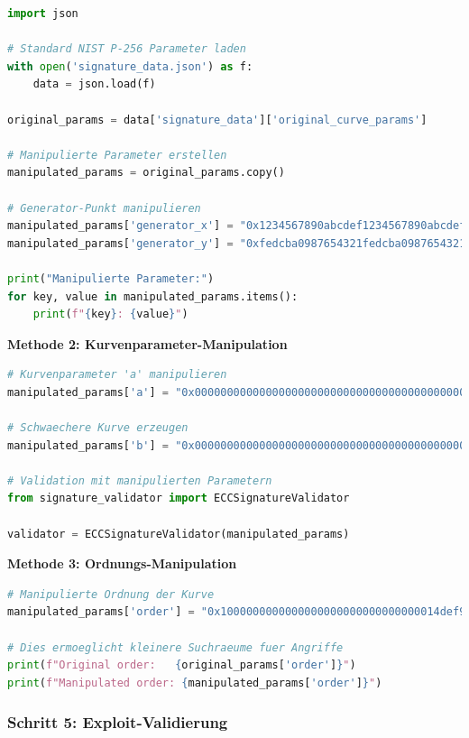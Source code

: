 \documentclass{article}
\begin{document}
\begin{lstlisting}[language=python, caption=Generator-Manipulation]
import json

# Standard NIST P-256 Parameter laden
with open('signature_data.json') as f:
    data = json.load(f)

original_params = data['signature_data']['original_curve_params']

# Manipulierte Parameter erstellen
manipulated_params = original_params.copy()

# Generator-Punkt manipulieren
manipulated_params['generator_x'] = "0x1234567890abcdef1234567890abcdef1234567890abcdef1234567890abcdef"
manipulated_params['generator_y'] = "0xfedcba0987654321fedcba0987654321fedcba0987654321fedcba0987654321"

print("Manipulierte Parameter:")
for key, value in manipulated_params.items():
    print(f"{key}: {value}")
\end{lstlisting}

\textbf{Methode 2: Kurvenparameter-Manipulation}

\begin{lstlisting}[language=python, caption=Kurvenkoeffizienten ändern]
# Kurvenparameter 'a' manipulieren 
manipulated_params['a'] = "0x0000000000000000000000000000000000000000000000000000000000000003"

# Schwaechere Kurve erzeugen
manipulated_params['b'] = "0x0000000000000000000000000000000000000000000000000000000000000007"

# Validation mit manipulierten Parametern
from signature_validator import ECCSignatureValidator

validator = ECCSignatureValidator(manipulated_params)
\end{lstlisting}

\textbf{Methode 3: Ordnungs-Manipulation}

\begin{lstlisting}[language=python, caption=Gruppenordnung manipulieren]
# Manipulierte Ordnung der Kurve
manipulated_params['order'] = "0x1000000000000000000000000000000014def9dea2f79cd65812631a5cf5d3ed"

# Dies ermoeglicht kleinere Suchraeume fuer Angriffe
print(f"Original order:   {original_params['order']}")
print(f"Manipulated order: {manipulated_params['order']}")
\end{lstlisting}

\subsubsection{Schritt 5: Exploit-Validierung}
\end{document}
